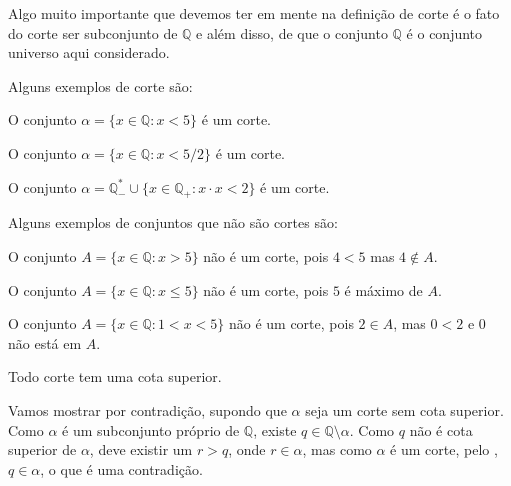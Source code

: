 \documentclass[../main.tex]{subfiles}
\begin{document}
\begin{obs}
    Algo muito importante que devemos ter em mente na definição de corte é o fato do corte ser subconjunto de $\mathbb{Q}$ e além disso, de que o conjunto $\mathbb{Q}$ é o conjunto universo aqui considerado.
\end{obs}

Alguns exemplos de corte são:

\begin{ex}
    O conjunto $\alpha = \{ x \in \mathbb{Q} : x < 5 \}$ é um corte.
\end{ex}
\begin{ex}
    O conjunto $\alpha = \{ x \in \mathbb{Q} : x < 5/2 \}$ é um corte.
\end{ex}
\begin{ex}
    O conjunto $\alpha =  \mathbb{Q}_{-}^* \cup \{ x \in \mathbb{Q_{+}} : x \cdot x < 2 \} $ é um corte.
\end{ex}

Alguns exemplos de conjuntos que não são cortes são:
\begin{ex}
    O conjunto $A = \{ x \in \mathbb{Q} : x > 5 \}$ não é um corte, pois $4 < 5$ mas $4 \not\in A$.
\end{ex}
\begin{ex}
    O conjunto $A = \{ x \in \mathbb{Q} : x \leq 5 \}$ não é um corte, pois $5$ é máximo de $A$.
\end{ex}
\begin{ex}
    O conjunto $A = \{ x \in \mathbb{Q} : 1 < x < 5 \}$ não é um corte, pois $2 \in A$, mas $0 < 2$ e $0$ não está em $A$.
\end{ex}

\begin{teo}
    Todo corte tem uma cota superior.
\end{teo}
\begin{dem}
    Vamos mostrar por contradição, supondo que $\alpha$ seja um corte sem cota superior.
    Como $\alpha$ é um subconjunto próprio de $\mathbb{Q}$, existe $q \in \mathbb{Q} \setminus \alpha$. Como $q$ não é cota superior de $\alpha$, deve existir um $r > q$, onde $r \in \alpha$, mas como $\alpha$ é um corte, pelo , $q \in \alpha$, o que é uma contradição.
\end{dem}
\end{document}

